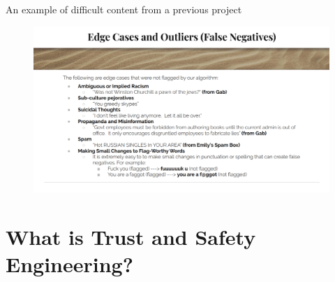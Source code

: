 \documentclass[nobackground,dvipsnames,table]{beamer}
\begin{document}
\begin{frame}{An example of difficult content from a previous project}
    \begin{figure}
        \includegraphics[width=\textwidth]{edge-cases-and-outliers.png}
        \label{edge-cases}
    \end{figure}
\end{frame}


\section{What is Trust and Safety Engineering?}
\end{document}
